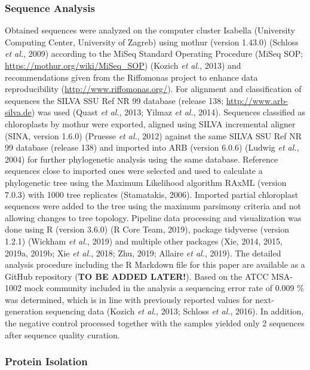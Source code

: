 \documentclass[12pt,]{article}
\begin{document}
\subsubsection{Sequence Analysis}\label{sequence-analysis}

Obtained sequences were analyzed on the computer cluster Isabella
(University Computing Center, University of Zagreb) using mothur
(version 1.43.0) (Schloss \emph{et al.}, 2009) according to the MiSeq
Standard Operating Procedure (MiSeq SOP;
\url{https://mothur.org/wiki/MiSeq_SOP}) (Kozich \emph{et al.}, 2013)
and recommendations given from the Riffomonas project to enhance data
reproducibility (\url{http://www.riffomonas.org/}). For alignment and
classification of sequences the SILVA SSU Ref NR 99 database (release
138; \url{http://www.arb-silva.de}) was used (Quast \emph{et al.}, 2013;
Yilmaz \emph{et al.}, 2014). Sequences classified as chloroplasts by
mothur were exported, aligned using SILVA incremental aligner (SINA,
version 1.6.0) (Pruesse \emph{et al.}, 2012) against the same SILVA SSU
Ref NR 99 database (release 138) and imported into ARB (version 6.0.6)
(Ludwig \emph{et al.}, 2004) for further phylogenetic analysis using the
same database. Reference sequences close to imported ones were selected
and used to calculate a phylogenetic tree using the Maximum Likelihood
algorithm RAxML (version 7.0.3) with 1000 tree replicates (Stamatakis,
2006). Imported partial chloroplast sequences were added to the tree
using the maximum parsimony criteria and not allowing changes to tree
topology. Pipeline data processing and visualization was done using R
(version 3.6.0) (R Core Team, 2019), package tidyverse (version 1.2.1)
(Wickham \emph{et al.}, 2019) and multiple other packages (Xie, 2014,
2015, 2019a, 2019b; Xie \emph{et al.}, 2018; Zhu, 2019; Allaire \emph{et
al.}, 2019). The detailed analysis procedure including the R Markdown
file for this paper are available as a GitHub repository (\textbf{TO BE
ADDED LATER!}). Based on the ATCC MSA-1002 mock community included in
the analysis a sequencing error rate of 0.009 \si{\percent} was
determined, which is in line with previously reported values for
next-generation sequencing data (Kozich \emph{et al.}, 2013; Schloss
\emph{et al.}, 2016). In addition, the negative control processed
together with the samples yielded only 2 sequences after sequence
quality curation.

\subsubsection{Protein Isolation}\label{protein-isolation}
\end{document}
